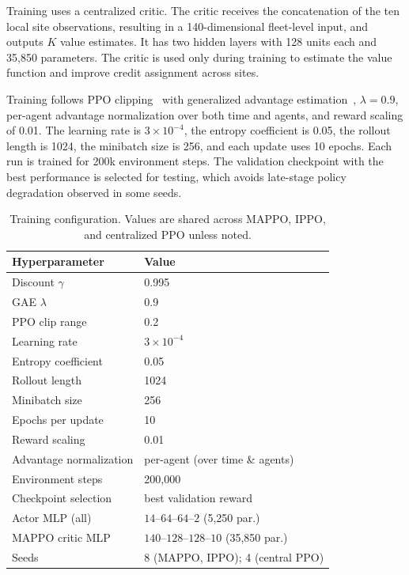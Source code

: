 \documentclass[10pt,conference,letterpaper]{IEEEtran}
\begin{document}
Training uses a centralized critic. The critic receives the concatenation of the
ten local site observations, resulting in a 140-dimensional fleet-level input,
and outputs $K$ value estimates. It has two hidden layers with 128 units each
and 35,850 parameters. The critic is used only during training to estimate the
value function and improve credit assignment across sites.

Training follows PPO clipping~\cite{ref:ppo} with generalized advantage
estimation~\cite{ref:gae}, $\lambda=0.9$, per-agent advantage normalization over
both time and agents, and reward scaling of 0.01. The learning rate is
$3\times10^{-4}$, the entropy coefficient is 0.05, the rollout length is 1024,
the minibatch size is 256, and each update uses 10 epochs. Each run is trained
for 200k environment steps. The validation checkpoint with the best performance
is selected for testing, which avoids late-stage policy degradation observed in
some seeds.


\begin{table}[!t]
\centering
\caption{Training configuration. Values are shared across MAPPO, IPPO,
and centralized PPO unless noted.}
\label{tab:hyperparams}
\renewcommand{\arraystretch}{1.1}\setlength{\tabcolsep}{4pt}\footnotesize
\begin{tabular}{@{}ll@{}}
\toprule
Hyperparameter & Value \\
\midrule
Discount $\gamma$            & 0.995 \\
GAE $\lambda$                & 0.9 \\
PPO clip range               & 0.2 \\
Learning rate                & $3\times10^{-4}$ \\
Entropy coefficient          & 0.05 \\
Rollout length               & 1024 \\
Minibatch size               & 256 \\
Epochs per update            & 10 \\
Reward scaling               & 0.01 \\
Advantage normalization      & per-agent (over time \& agents) \\
Environment steps            & 200{,}000 \\
Checkpoint selection         & best validation reward \\
\midrule
Actor MLP (all)              & $14$--$64$--$64$--$2$ (5{,}250 par.) \\
MAPPO critic MLP             & $140$--$128$--$128$--$10$ (35{,}850 par.) \\
Seeds                        & 8 (MAPPO, IPPO); 4 (central PPO) \\
\bottomrule
\end{tabular}
\end{table}
\end{document}
